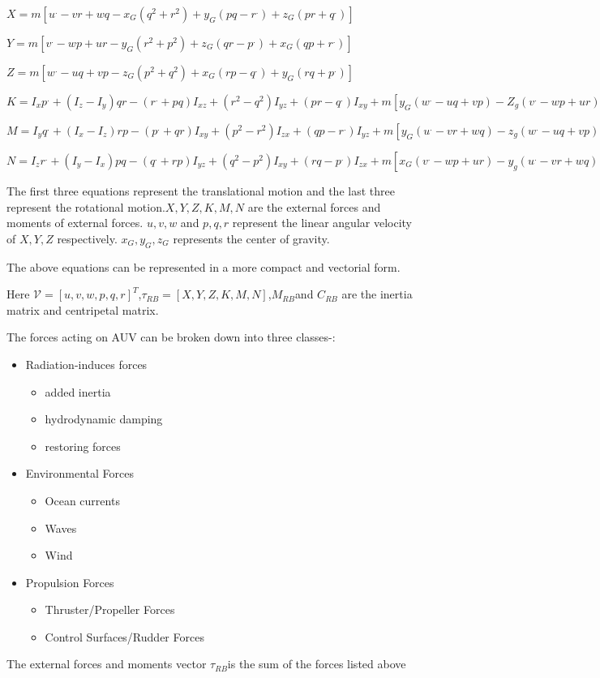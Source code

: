 \documentclass[12pt]{dalcsthesis}
\begin{document}
$X=m[u^{.}-vr+wq-x_{G}(q^{2}+r^{2})+y_{G}(pq-r^{.})+z_{G}(pr+q^{.})]$


$Y=m[v^{.}-wp+ur-y_{G}(r^{2}+p^{2})+z_{G}(qr-p^{.})+x_{G}(qp+r^{.})]$

$Z=m[w^{.}-uq+vp-z_{G}(p^{2}+q^{2})+x_{G}(rp-q^{.})+y_{G}(rq+p^{.})]$

$K=I_{x}p^{.}+(I_{z}-I_{y})qr-(r^{.}+pq)I_{xz}+(r^{2}-q^{2})I_{yz}+(pr-q^{.})I_{xy}+m[y_{G}(w^{.}-uq+vp)-Z_{g}(v^{.}-wp+ur)]$

$M=I_{y}q^{.}+(I_{x}-I_{z})rp-(p^{.}+qr)I_{xy}+(p^{2}-r^{2})I_{zx}+(qp-r^{.})I_{yz}+m[y_{G}(u^{.}-vr+wq)-z_{g}(w^{.}-uq+vp)]$

$N=I_{z}r^{.}+(I_{y}-I_{x})pq-(q^{.}+rp)I_{yz}+(q^{2}-p^{2})I_{xy}+(rq-p^{.})I_{zx}+m[x_{G}(v^{.}-wp+ur)-y_{g}(u^{.}-vr+wq)]$

The first three equations represent the translational motion and the
last three represent the rotational motion.$X,Y,Z,K,M,N$ are the
external forces and moments of external forces. $u,v,w$ and $p,q,r$
represent the linear angular velocity of $X,Y,Z$ respectively. $x_{G},y_{G},z_{G}$
represents the center of gravity.

The above equations can be represented in a more compact and vectorial
form.


Here $\mathcal{V}=[u,v,w,p,q,r]^{T}$,$\tau_{RB}=[X,Y,Z,K,M,N]$,$M_{RB}$and
$C_{RB}$ are the inertia matrix and centripetal matrix. 

The forces acting on AUV can be broken down into three classes-:
\begin{itemize}
\item Radiation-induces forces

\begin{itemize}
\item added inertia
\item hydrodynamic damping
\item restoring forces
\end{itemize}
\item Environmental Forces

\begin{itemize}
\item Ocean currents
\item Waves
\item Wind
\end{itemize}
\item Propulsion Forces

\begin{itemize}
\item Thruster/Propeller Forces
\item Control Surfaces/Rudder Forces
\end{itemize}
\end{itemize}
The external forces and moments vector $\tau_{RB}$is the sum of the
forces listed above 
\end{document}
